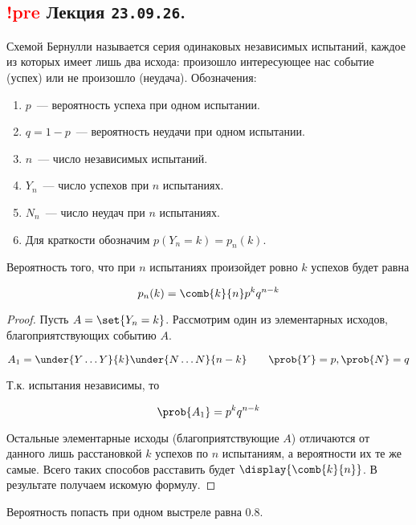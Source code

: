 \subsection{%
  \textcolor{red}{!pre} Лекция \texttt{23.09.26}.%
}


\begin{definition}
  Схемой Бернулли называется серия одинаковых независимых испытаний, каждое из
  которых имеет лишь два исхода: произошло интересующее нас событие (успех) или
  не произошло (неудача). Обозначения:

  \begin{enumerate}
  \item
    \(p\)~--- вероятность успеха при одном испытании.

  \item
    \(q = 1 - p\)~--- вероятность неудачи при одном испытании.

  \item
    \(n\)~--- число независимых испытаний.

  \item
    \(Y_n\)~--- число успехов при \(n\) испытаниях.

  \item
    \(N_n\)~--- число неудач при \(n\) испытаниях.

  \item
    Для краткости обозначим \(p(Y_n = k) = p_n(k)\).
  \end{enumerate}
\end{definition}


\begin{theorem}
  Вероятность того, что при \(n\) испытаниях произойдет ровно \(k\) успехов
  будет равна

  \begin{equation*}
    p_n(k) = \comb{k}{n} p^k q^{n - k}
  \end{equation*}
\end{theorem}

\begin{proof}
  Пусть \(A = \set{Y_n = k}\). Рассмотрим один из элементарных исходов,
  благоприятствующих событию \(A\).

  \begin{equation*}
    A_1 = \under{Y \dotsc Y}{k} \under{N \dotsc N}{n - k}
    \qquad
    \prob{Y} = p, \prob{N} = q
  \end{equation*}

  Т.к. испытания независимы, то

  \begin{equation*}
    \prob{A_1} = p^k q^{n - k}
  \end{equation*}

  Остальные элементарные исходы (благоприятствующие \(A\)) отличаются от данного
  лишь расстановкой \(k\) успехов по \(n\) испытаниям, а вероятности их те же
  самые. Всего таких способов расставить будет \(\display{\comb{k}{n}}\). В
  результате получаем искомую формулу.
\end{proof}

\begin{example}
  Вероятность попасть при одном выстреле равна \(0.8\).
\end{example}
